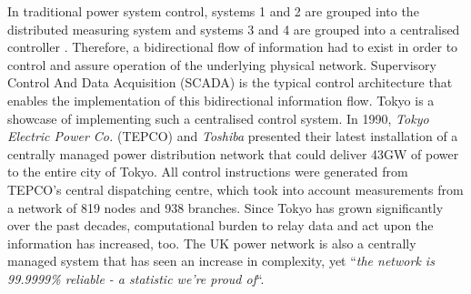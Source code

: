 
In traditional power system control, systems 1 and 2 are grouped into the distributed measuring system and systems 3 and 4 are grouped into a centralised controller \cite{Nelson1985}.
Therefore, a bidirectional flow of information had to exist in order to control and assure operation of the underlying physical network.
Supervisory Control And Data Acquisition (SCADA) is the typical control architecture that enables the implementation of this bidirectional information flow.
Tokyo is a showcase of implementing such a centralised control system.
In 1990, \textit{Tokyo Electric Power Co.} (TEPCO) and \textit{Toshiba} presented their latest installation of a centrally managed power distribution network that could deliver 43GW of power to the entire city of Tokyo.
All control instructions were generated from TEPCO's central dispatching centre, which took into account measurements from a network of 819 nodes and 938 branches.
Since Tokyo has grown significantly over the past decades, computational burden to relay data and act upon the information has increased, too.
The UK power network is also a centrally managed system that has seen an increase in complexity, yet ``\textit{the network is 99.9999\% reliable - a statistic we're proud of}``\cite{NationalGrid2017}.



